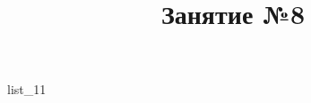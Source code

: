 \documentclass[12pt, a4paper]{article}
\begin{document}
	\title{Занятие №8}
	{list_11}
\end{document}
